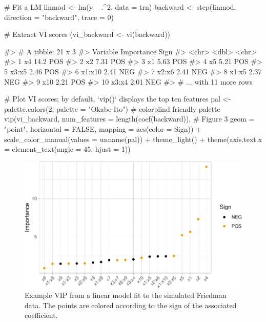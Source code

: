 \begin{Schunk}
\begin{Sinput}
# Fit a LM
linmod <- lm(y ~ .^2, data = trn)
backward <- step(linmod, direction = "backward", trace = 0)

# Extract VI scores
(vi_backward <- vi(backward))
\end{Sinput}
\begin{Soutput}
#> # A tibble: 21 x 3
#>    Variable Importance Sign
#>    <chr>         <dbl> <chr>
#>  1 x4            14.2  POS
#>  2 x2             7.31 POS
#>  3 x1             5.63 POS
#>  4 x5             5.21 POS
#>  5 x3:x5          2.46 POS
#>  6 x1:x10         2.41 NEG
#>  7 x2:x6          2.41 NEG
#>  8 x1:x5          2.37 NEG
#>  9 x10            2.21 POS
#> 10 x3:x4          2.01 NEG
#> # ... with 11 more rows
\end{Soutput}
\begin{Sinput}
# Plot VI scores; by default, `vip()` displays the top ten features
pal <- palette.colors(2, palette = "Okabe-Ito")  # colorblind friendly palette
vip(vi_backward, num_features = length(coef(backward)),  # Figure 3
    geom = "point", horizontal = FALSE, mapping = aes(color = Sign)) +
  scale_color_manual(values = unname(pal)) +
  theme_light() +
  theme(axis.text.x = element_text(angle = 45, hjust = 1))
\end{Sinput}
\begin{figure}[!htb]

{\centering \includegraphics[width=0.7\linewidth]{greenwell-boehmke_files/figure-latex/vip-step-1}

}

\caption[Example VIP from a linear model fit to the simulated Friedman data]{Example VIP from a linear model fit to the simulated Friedman data. The points are colored according to the sign of the associated coefficient.}\label{fig:vip-step}
\end{figure}
\end{Schunk}

